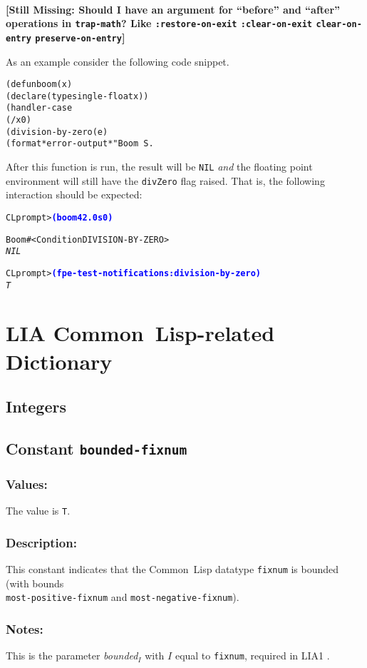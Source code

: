 \documentclass[10pt,fleqn]{article}
\newcommand{\CL}{\textsf{Common~Lisp}}
\newcommand{\missingpart}[1]{{\ }\vspace{2mm}\\
{\textbf{[Still Missing: #1]}}\\
\vspace{2mm}}
\newcommand{\code}[1]{\texttt{#1}}
\newcommand{\codeprompt}[1]{\textcolor{blue}{\textbf{#1}}}
\newcommand{\DDictionaryItem}[1]{\vspace*{6pt}\noindent\hrulefill\vspace*{-9pt}\subsection*{#1}}
\newcommand{\DDescription}{\subsubsection*{Description:}}
\newcommand{\DNotes}{\subsubsection*{Notes:}}
\newcommand{\DValues}{\subsubsection*{Values:}}
\begin{document}
\missingpart{Should I have an argument for ``before'' and
  ``after'' operations in \code{trap-math}?  Like
  \code{:restore-on-exit} \code{:clear-on-exit} \code{clear-on-entry}
  \code{preserve-on-entry}}

\noindent
As an example consider the following code snippet.
\begin{alltt}
(defun boom (x)
    (declare (type single-float x))
    (handler-case 
        (/ x 0)
      (division-by-zero (e)
        (format *error-output* "Boom ~S.~%" e)))
\end{alltt}
After this function is run, the result will be \code{NIL} \emph{and} the
floating point environment will still have the \code{divZero} flag raised.
That is, the following interaction should be expected:
\begin{alltt}
CL prompt> \codeprompt{(boom 42.0s0)}

Boom #<Condition DIVISION-BY-ZERO>
\textit{NIL}

CL prompt> \codeprompt{(fpe-test-notifications :division-by-zero)}
\textit{T}
\end{alltt}


\newpage

\section{LIA \CL{}-related Dictionary}

\subsection{Integers}


\DDictionaryItem{Constant \code{bounded-fixnum}}
\index{B!\code{bounded-fixnum}}

\DValues{}

The value is \code{T}.

\DDescription{}

This constant indicates that the \CL{} datatype \code{fixnum} is
bounded (with bounds\\
\code{most-positive-fixnum} and
\code{most-negative-fixnum}).

\DNotes{}

This is the parameter \textit{bounded}$_I$ with $I$ equal to
\code{fixnum}, required in LIA1 \cite{2012:LIA1}.
\end{document}
